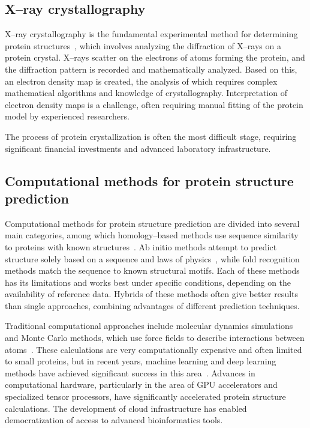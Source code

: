 \subsection{X--ray crystallography}
X--ray crystallography is the fundamental experimental method for determining protein structures~\cite{xray_crystallography}, which involves analyzing the diffraction of X--rays on a protein crystal.
X--rays scatter on the electrons of atoms forming the protein, and the diffraction pattern is recorded and mathematically analyzed.
Based on this, an electron density map is created, the analysis of which requires complex mathematical algorithms and knowledge of crystallography.
Interpretation of electron density maps is a challenge, often requiring manual fitting of the protein model by experienced researchers.

The process of protein crystallization is often the most difficult stage, requiring significant financial investments and advanced laboratory infrastructure.

\subsection{Computational methods for protein structure prediction}
Computational methods for protein structure prediction are divided into several main categories, among which homology--based methods use sequence similarity to proteins with known structures~\cite{baek2023overview}.
Ab initio methods attempt to predict structure solely based on a sequence and laws of physics~\cite{ab_initio_protein_folding}, while fold recognition methods match the sequence to known structural motifs.
Each of these methods has its limitations and works best under specific conditions, depending on the availability of reference data.
Hybrids of these methods often give better results than single approaches, combining advantages of different prediction techniques.

Traditional computational approaches include molecular dynamics simulations and Monte Carlo methods, which use force fields to describe interactions between atoms~\cite{zhang2008itasser}.
These calculations are very computationally expensive and often limited to small proteins, but in recent years, machine learning and deep learning methods have achieved significant success in this area~\cite{senior2020deep}.
Advances in computational hardware, particularly in the area of GPU accelerators and specialized tensor processors, have significantly accelerated protein structure calculations.
The development of cloud infrastructure has enabled democratization of access to advanced bioinformatics tools.

